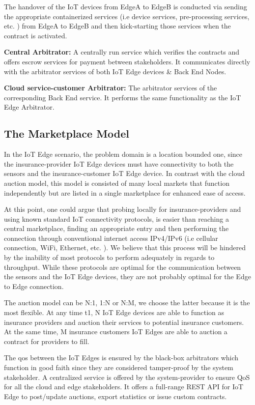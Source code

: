 The handover of the IoT devices from EdgeA to EdgeB is conducted via sending the appropriate containerized services (i.e device services, pre-processing services, etc. ) from EdgeA to EdgeB and then kick-starting those services when the contract is activated.

\textbf{Central Arbitrator:} A centrally run service which verifies the contracts and offers escrow services for payment between stakeholders. It communicates directly with the arbitrator services of both IoT Edge devices \& Back End Nodes.

\textbf{Cloud service-customer Arbitrator:} The arbitrator services of the corresponding Back End service. It performs the same functionality as the IoT Edge Arbitrator.

\subsection{The Marketplace Model}

In the IoT Edge scenario, the problem domain is a location bounded one, since the insurance-provider IoT Edge devices must have connectivity to both the sensors and the insurance-customer IoT Edge device. In contrast with the cloud auction model, this model is consisted of many local markets that function independently but are listed in a single marketplace for enhanced ease of access.
 
At this point, one could argue that probing locally for insurance-providers and using known standard IoT connectivity  protocols, is easier than reaching a central marketplace, finding an appropriate entry and then performing the connection through conventional internet access IPv4/IPv6 (i.e cellular connection, WiFi, Ethernet, etc. ). We believe that this process will be hindered by the inability of most protocols to perform adequately in regards to throughput. While these protocols are optimal for the communication between the sensors and the IoT Edge devices, they are not probably optimal for the Edge to Edge connection.
 
The auction model can be N:1, 1:N or N:M, we choose the latter because it is the most flexible. At any time t1, N IoT Edge devices are able to function as insurance providers and auction their services to potential insurance customers. At the same time, M insurance customers IoT Edges are able to auction a contract for providers to fill.
 
The \acrfull{qos} between the IoT Edges is ensured by the black-box arbitrators which function in good faith since they are considered tamper-proof by the system stakeholder. A centralized service is offered by the \gls{system-provider} to ensure QoS for all the cloud and edge stakeholders. It offers a full-range REST API for IoT Edge to post/update auctions, export statistics or issue custom contracts.
 
